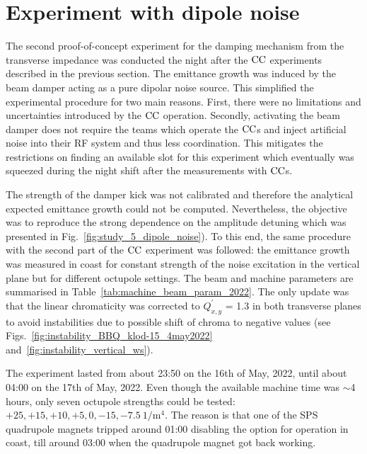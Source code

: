 \section{Experiment with dipole noise}\label{sec:coast_md_damper_2022}
The second proof-of-concept experiment for the damping mechanism from the transverse impedance was conducted the night after the ${\mathrm{CC}}$ experiments described in the previous section. The emittance growth was induced by the beam damper acting as a pure dipolar noise source. This simplified the experimental procedure for two main reasons. First, there were no limitations and uncertainties introduced by the ${\mathrm{CC}}$ operation. Secondly, activating the beam damper does not require the teams which operate the ${\mathrm{CC}}$s and inject artificial noise into their RF system and thus less coordination. This mitigates the restrictions on finding an available slot for this experiment which eventually was squeezed during the night shift after the measurements with ${\mathrm{CC}}$s. %

The strength of the damper kick was not calibrated and therefore the analytical expected emittance growth could not be computed. Nevertheless, the objective was to reproduce the strong dependence on the amplitude detuning which was presented in Fig.~\ref{fig:study_5_dipole_noise}). To this end, the same procedure with the second part of the ${\mathrm{CC}}$ experiment was followed: the emittance growth was measured in coast for constant strength of the noise excitation in the vertical plane but for different octupole settings. The beam and machine parameters are summarised in Table~\ref{tab:machine_beam_param_2022}. The only update was that the linear chromaticity was corrected to $Q^\prime_{x,y}$ = 1.3 in both transverse planes to avoid instabilities due to possible shift of chroma to negative values (see Figs.~\ref{fig:instability_BBQ_klod-15_4may2022} and~\ref{fig:instability_vertical_ws}). 

The experiment lasted from about 23:50 on the 16th of May, 2022, until about 04:00 on the 17th of May, 2022. Even though the available machine time was $\sim$4 hours, only seven octupole strengths could be tested: $+25, +15, +10, +5, 0, -15, -7.5 \ \mathrm{1/m^4}$. The reason is that one of the SPS quadrupole magnets tripped around 01:00 disabling the option for operation in coast, till around 03:00 when the quadrupole magnet got back working.

